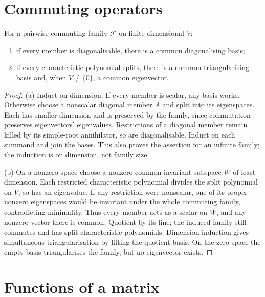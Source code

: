 \section{Commuting operators}
\begin{theorem}\label{linear:thm:commuting}
For a pairwise commuting family $\mathcal F$ on finite-dimensional $V$:
\begin{enumerate}[label=(\alph*)]
\item if every member is diagonalisable, there is a common diagonalising basis;
\item if every characteristic polynomial splits, there is a common triangularising basis and, when $V\ne\{0\}$, a common eigenvector.
\end{enumerate}
\end{theorem}
\begin{proof}
(a) Induct on dimension. If every member is scalar, any basis works. Otherwise choose a nonscalar diagonal member $A$ and split into its eigenspaces. Each has smaller dimension and is preserved by the family, since commutation preserves eigenvectors' eigenvalues. Restrictions of a diagonal member remain killed by its simple-root annihilator, so are diagonalisable. Induct on each summand and join the bases. This also proves the assertion for an infinite family; the induction is on dimension, not family size.

(b) On a nonzero space choose a nonzero common invariant subspace $W$ of least dimension. Each restricted characteristic polynomial divides the split polynomial on $V$, so has an eigenvalue. If any restriction were nonscalar, one of its proper nonzero eigenspaces would be invariant under the whole commuting family, contradicting minimality. Thus every member acts as a scalar on $W$, and any nonzero vector there is common. Quotient by its line; the induced family still commutes and has split characteristic polynomials. Dimension induction gives simultaneous triangularisation by lifting the quotient basis. On the zero space the empty basis triangularises the family, but no eigenvector exists.
\end{proof}

\section{Functions of a matrix}

